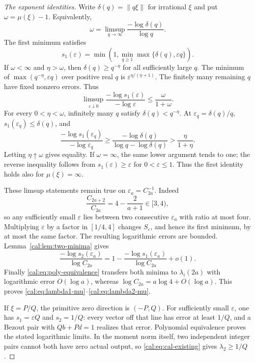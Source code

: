 \documentclass[11pt,a4paper]{article}
\numberwithin{equation}{section}
\theoremstyle{definition}\newtheorem{definition}[theorem]{Definition}
\theoremstyle{remark}\newtheorem{remark}[theorem]{Remark}
\begin{document}
\begin{proof}[The exponent identities]
Write $\delta(q)=\|q\xi\|$ for irrational $\xi$ and put
$\omega=\mu(\xi)-1$. Equivalently,
\[
 \omega=\limsup_{q\to\infty}\frac{-\log\delta(q)}{\log q}.
\]
The first minimum satisfies
\[
 s_1(\varepsilon)=\min\left(1,\min_{q\ge1}
                         \max\{\delta(q),\varepsilon q\}\right).
\]
If $\omega<\infty$ and $\eta>\omega$, then
$\delta(q)\ge q^{-\eta}$ for all sufficiently large $q$.
The minimum of $\max(q^{-\eta},\varepsilon q)$ over positive
real $q$ is $\varepsilon^{\eta/(\eta+1)}$. The finitely many
remaining $q$ have fixed nonzero errors. Thus
\[
 \limsup_{\varepsilon\downarrow0}
 \frac{-\log s_1(\varepsilon)}{-\log\varepsilon}
 \le\frac\omega{1+\omega}.
\]
For every $0<\eta<\omega$, infinitely many $q$ satisfy
$\delta(q)<q^{-\eta}$. At $\varepsilon_q=\delta(q)/q$,
$s_1(\varepsilon_q)\le\delta(q)$, and
\[
 \frac{-\log s_1(\varepsilon_q)}{-\log\varepsilon_q}
 \ge\frac{-\log\delta(q)}{\log q-\log\delta(q)}
 >\frac\eta{1+\eta}.
\]
Letting $\eta\uparrow\omega$ gives equality. If $\omega=\infty$,
the same lower argument tends to one; the reverse inequality
follows from $s_1(\varepsilon)\ge\varepsilon$ for
$0<\varepsilon\le1$. Thus the first identity holds also for
$\mu(\xi)=\infty$.

These limsup statements remain true on
$\varepsilon_a=C_{2a}^{-1}$. Indeed
\[
 \frac{C_{2a+2}}{C_{2a}}=4-\frac2{a+1}\in[3,4),
\]
so any sufficiently small $\varepsilon$ lies between two consecutive
$\varepsilon_a$ with ratio at most four. Multiplying $\varepsilon$
by a factor in $[1/4,4]$ changes $S_\varepsilon$, and hence its
first minimum, by at most the same factor. The resulting logarithmic
errors are bounded. Lemma~\ref{cal:lem:two-minima} gives
\[
 \frac{-\log s_2(\varepsilon_a)}{\log C_{2a}}
 =1-\frac{-\log s_1(\varepsilon_a)}{\log C_{2a}}+o(1).
\]
Finally \eqref{cal:eq:poly-equivalence} transfers both minima to
$\lambda_i(2a)$ with logarithmic error $O(\log a)$, whereas
$\log C_{2a}=a\log4+O(\log a)$. This proves
\eqref{cal:eq:lambda1-mu}--\eqref{cal:eq:lambda2-mu}.

If $\xi=P/Q$, the primitive zero direction is $(-P,Q)$.
For sufficiently small $\varepsilon$, one has
$s_1=\varepsilon Q$ and $s_2=1/Q$: every vector off that line
has error at least $1/Q$, and a Bezout pair with
$Qb+Pd=1$ realizes that error. Polynomial equivalence proves the
stated logarithmic limits. In the moment norm itself, two independent
integer pairs cannot both have zero actual output, so
\eqref{cal:eq:cal-existing} gives $\lambda_2\ge1/Q$.
\end{proof}
\end{document}
